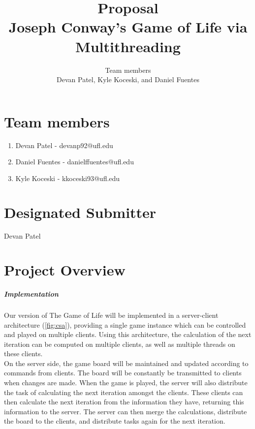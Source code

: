 \documentclass[12pt,a4paper]{report}
\author{Team members \\{\normalsize Devan Patel, Kyle Koceski, and Daniel Fuentes}}
\title{Proposal \\ {\large Joseph Conway's Game of Life via Multithreading} }
\begin{document}
\maketitle
\newpage
\section{Team members}
\begin{enumerate}
\item Devan Patel - devanp92@ufl.edu
\item Daniel Fuentes - danielffuentes@ufl.edu
\item Kyle Koceski - kkoceski93@ufl.edu
\end{enumerate}
\section{Designated Submitter}
\paragraph{}
Devan Patel
\section{Project Overview}
\subparagraph{Implementation}
Our version of The Game of Life will be implemented in a server-client architecture (\ref{fig:csa}), providing a single game instance which can be controlled and played on multiple clients. Using this architecture, the calculation of the next iteration can be computed on multiple clients, as well as multiple threads on these clients. \\

On the server side, the game board will be maintained and updated according to commands from clients. The board will be constantly be transmitted to clients when changes are made. When the game is played, the server will also distribute the task of calculating the next iteration amongst the clients. These clients can then calculate the next iteration from the information they have, returning this information to the server. The server can then merge the calculations, distribute the board to the clients, and distribute tasks again for the next iteration. \\
\end{document}
